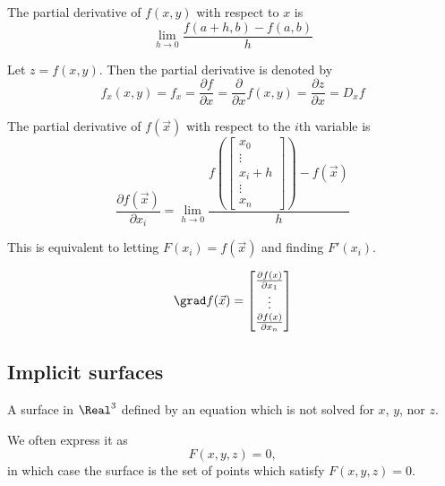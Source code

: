 
\begin{definition}
  The partial derivative of $f(x, y)$ with respect to $x$ is
  \[
    \lim_{h \to 0} \frac{f(a + h, b) - f(a, b)}{h}
  \]

  Let $z = f(x, y)$. Then the partial derivative is denoted by
  \[
    f_x(x, y) = f_x = \frac{\partial f}{\partial x} = \frac{\partial}{\partial x} f(x, y) = \frac{\partial z}{\partial x} = D_x f
  \]
\end{definition}

\begin{definition}
  The partial derivative of $f(\vec{x})$ with respect to the $i$th variable is
  \[
    \frac{\partial f(\vec{x})}{\partial x_i} = \lim_{h \to 0} \frac{f\left(\begin{bmatrix}
      x_0 \\
      \vdots \\
      x_i + h \\
      \vdots \\
      x_n
    \end{bmatrix}\right) - f\left(\vec{x}\right)}{h}
  \]

  This is equivalent to letting $F(x_i) = f(\vec{x})$ and finding $F'(x_i)$.
\end{definition}

\begin{definition}[Gradient]
  \[
    \grad f(\vec{x}) = \begin{bmatrix}
      \frac{\partial f(x)}{\partial x_1} \\
      \vdots \\
      \frac{\partial f(x)}{\partial x_n}
    \end{bmatrix}
  \]
\end{definition}

\subsection{Implicit surfaces}


\begin{definition}
  A surface in $\Real^3$ defined by an equation which is not solved for $x$, $y$, nor $z$.

  We often express it as
  \[
    F(x, y, z) = 0,
  \]
  in which case the surface is the set of points which satisfy $F(x, y, z) = 0$.
\end{definition}

